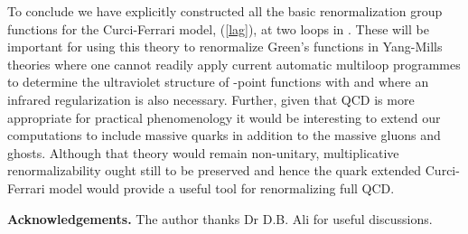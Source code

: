\documentclass[a4paper,11pt]{article}
\providecommand{\MSbar}{\overline{\mbox{MS}}}
\begin{document}
To conclude we have explicitly constructed all the basic renormalization group
functions for the Curci-Ferrari model, (\ref{lag}), at two loops in \myHighlight{$\MSbar$}\coordHE{}. 
These will be important for using this theory to renormalize Green's functions 
in Yang-Mills theories where one cannot readily apply current automatic 
multiloop programmes to determine the ultraviolet structure of \coordHE{}-point 
functions with \coordHE{}  \myHighlight{$>$}\coordHE{}  \coordHE{} and where an infrared regularization is also 
necessary. Further, given that QCD is more appropriate for practical 
phenomenology it would be interesting to extend our computations to include 
massive quarks in addition to the massive gluons and ghosts. Although that 
theory would remain non-unitary, multiplicative renormalizability ought still 
to be preserved and hence the quark extended Curci-Ferrari model would provide 
a useful tool for renormalizing full QCD.  

\vspace{0.3cm} 
\noindent 
{\bf Acknowledgements.} The author thanks Dr D.B. Ali for useful discussions. 

\newpage 
\end{document}
